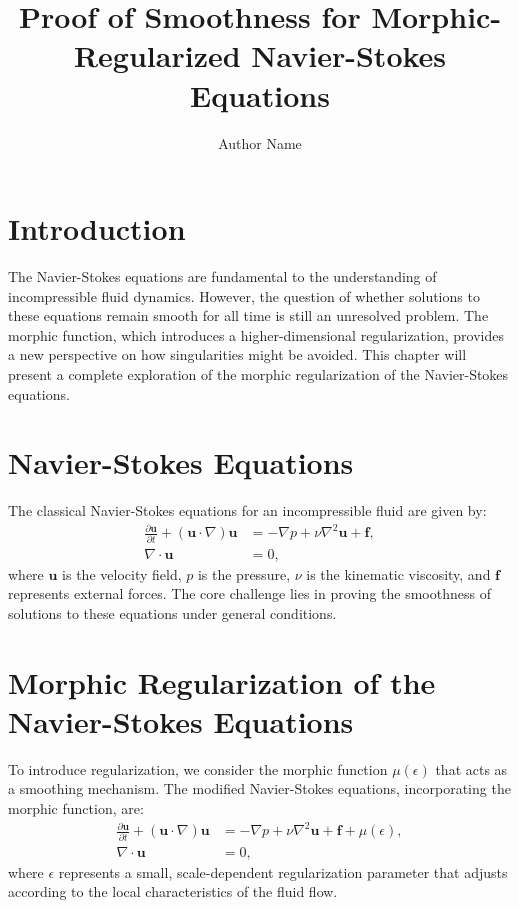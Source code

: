 \documentclass{article}
\title{Proof of Smoothness for Morphic-Regularized Navier-Stokes Equations}
\author{Author Name}
\begin{document}
\maketitle

\section{Introduction}
The Navier-Stokes equations are fundamental to the understanding of incompressible fluid dynamics. However, the question of whether solutions to these equations remain smooth for all time is still an unresolved problem. The morphic function, which introduces a higher-dimensional regularization, provides a new perspective on how singularities might be avoided. This chapter will present a complete exploration of the morphic regularization of the Navier-Stokes equations.

\section{Navier-Stokes Equations}
The classical Navier-Stokes equations for an incompressible fluid are given by:
\begin{align}
    \frac{\partial \mathbf{u}}{\partial t} + (\mathbf{u} \cdot \nabla) \mathbf{u} &= -\nabla p + \nu \nabla^2 \mathbf{u} + \mathbf{f}, \\
    \nabla \cdot \mathbf{u} &= 0,
\end{align}
where \( \mathbf{u} \) is the velocity field, \( p \) is the pressure, \( \nu \) is the kinematic viscosity, and \( \mathbf{f} \) represents external forces. The core challenge lies in proving the smoothness of solutions to these equations under general conditions.

\section{Morphic Regularization of the Navier-Stokes Equations}
To introduce regularization, we consider the morphic function \( \mu(\epsilon) \) that acts as a smoothing mechanism. The modified Navier-Stokes equations, incorporating the morphic function, are:
\begin{align}
    \frac{\partial \mathbf{u}}{\partial t} + (\mathbf{u} \cdot \nabla) \mathbf{u} &= -\nabla p + \nu \nabla^2 \mathbf{u} + \mathbf{f} + \mu(\epsilon), \\
    \nabla \cdot \mathbf{u} &= 0,
\end{align}
where \( \epsilon \) represents a small, scale-dependent regularization parameter that adjusts according to the local characteristics of the fluid flow.
\end{document}
